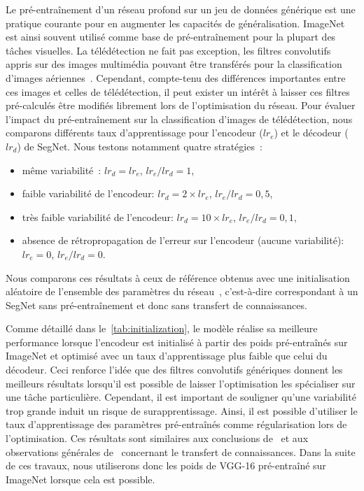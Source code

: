 Le pré-entraînement d'un réseau profond sur un jeu de données générique est une pratique courante pour en augmenter les capacités de généralisation. ImageNet est ainsi souvent utilisé comme base de pré-entraînement pour la plupart des tâches visuelles. La télédétection ne fait pas exception, les filtres convolutifs appris sur des images multimédia pouvant être transférés pour la classification d'images aériennes~\cite{penatti_deep_2015}. Cependant, compte-tenu des différences importantes entre ces images et celles de télédétection, il peut exister un intérêt à laisser ces filtres pré-calculés être modifiés librement lors de l'optimisation du réseau. Pour évaluer l'impact du pré-entraînement sur la classification d'images de télédétection, nous comparons différents taux d'apprentissage pour l'encodeur ($lr_{e}$) et le décodeur ($lr_{d}$) de SegNet. Nous testons notamment quatre stratégies~:
\begin{itemize}
  \item même variabilité~: $lr_{d} = lr_{e}$, ${lr_{e} / lr_{d}} = 1$,
  \item faible variabilité de l'encodeur: $lr_{d} = 2 \times lr_{e}$, ${lr_{e} / lr_{d}} = 0,5$,
  \item très faible variabilité de l'encodeur: $lr_{d} = 10 \times lr_{e}$, ${lr_{e} / lr_{d}} = 0,1$,
  \item absence de rétropropagation de l'erreur sur l'encodeur (aucune variabilité): $lr_{e} = 0$, ${lr_{e} / lr_{d}} = 0$.
\end{itemize}

Nous comparons ces résultats à ceux de référence obtenus avec une initialisation aléatoire de l'ensemble des paramètres du réseau~\cite{he_delving_2015}, c'est-à-dire correspondant à un SegNet sans pré-entraînement et donc sans transfert de connaissances.

Comme détaillé dans le~\cref{tab:initialization}, le modèle réalise sa meilleure performance lorsque l'encodeur est initialisé à partir des poids pré-entraînés sur ImageNet et optimisé avec un taux d'apprentissage plus faible que celui du décodeur. Ceci renforce l'idée que des filtres convolutifs génériques donnent les meilleurs résultats lorsqu'il est possible de laisser l'optimisation les spécialiser sur une tâche particulière. Cependant, il est important de souligner qu'une variabilité trop grande induit un risque de surapprentissage. Ainsi, il est possible d'utiliser le taux d'apprentissage des paramètres pré-entraînés comme régularisation lors de l'optimisation. Ces résultats sont similaires aux conclusions de~\cite{nogueira_towards_2016} et aux observations générales de~\cite{yosinski_how_2014} concernant le transfert de connaissances. Dans la suite de ces travaux, nous utiliserons donc les poids de VGG-16 pré-entraîné sur ImageNet lorsque cela est possible.

